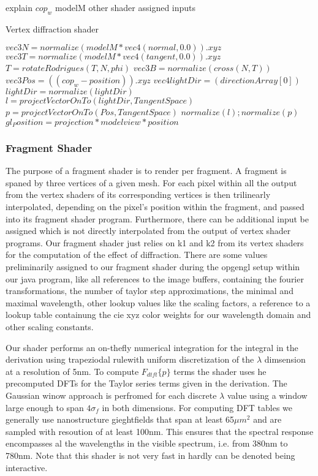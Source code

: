 explain $cop_w$
modelM
other shader assigned inputs

\begin{algorithm}
  \caption{Vertex diffraction shader}
  \begin{algorithmic}
      \State $ vec3 N = normalize(modelM * vec4(normal,0.0)).xyz$
      \State $ vec3 T = normalize(modelM * vec4(tangent,0.0)).xyz$
      \State $ T = rotateRodrigues(T, N, phi)$
      \State $ vec3 B = normalize(cross(N, T))$
      \State $ vec3 Pos = ((cop_w-position)).xyz$
      \State $ vec4 lightDir = (directionArray[0])$
      \State $ lightDir = normalize(lightDir)$
      \State $ l = projectVectorOnTo(lightDir, TangentSpace)$
      \State $ p = projectVectorOnTo(Pos, TangentSpace)$
      \State $normalize(l); normalize(p)$
      \State $gl_Position = projection * modelview * position$
    \EndFor
  \end{algorithmic}
\end{algorithm}


\subsubsection{Fragment Shader}

The purpose of a fragment shader is to render per fragment. A fragment is spaned by three vertices of a given mesh. For each pixel within all the output from the vertex shaders of its corresponding vertices is then trilinearly interpolated, depending on the pixel's position within the fragment, and passed into its fragment shader program.
Furthermore, there can be additional input be assigned which is not directly interpolated from the output of vertex shader programs. Our fragment shader just relies on k1 and k2 from its vertex shaders for the computation of the effect of diffraction.
There are some values preliminarily assigned to our fragment shader during the opgengl setup within our java program, like all references to the image buffers, containing the fourier transformations, the number of taylor step approximations, the minimal and maximal wavelength, other lookup values like the scaling factors, a reference to a lookup table containung the cie xyz color weights for our wavelength domain and other scaling constants.

Our shader performs an on-thefly numerical integration for the integral in the derivation using trapeziodal rulewith uniform discretization of the $\lambda$ dimsension at a resolution of 5nm. To compute $F_{dtft}\{p\}$ terms the shader uses he precomputed DFTs for the Taylor series terms given in the derivation. The Gaussian winow approach is perfromed for each discrete $\lambda$ value using a window large enough to span $4\sigma_f$ in both dimensions. For computing DFT tables we generally use nanostructure gieghtfields that span at least 65$\mu m^2$ and are sampled with resoution of at least 100nm. This ensures that the spectral response encompasses al the wavelengths in the visible spectrum, i.e. from 380nm to 780nm. Note that this shader is not very fast in hardly can be denoted being interactive. 

